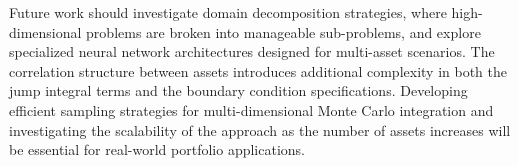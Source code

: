 \documentclass[11pt,twoside,openright]{report}
\begin{document}
Future work should investigate domain decomposition strategies, where high-dimensional problems are broken into manageable sub-problems, and explore specialized neural network architectures designed for multi-asset scenarios. The correlation structure between assets introduces additional complexity in both the jump integral terms and the boundary condition specifications. Developing efficient sampling strategies for multi-dimensional Monte Carlo integration and investigating the scalability of the approach as the number of assets increases will be essential for real-world portfolio applications.

\cleardoublepage


\end{document}
